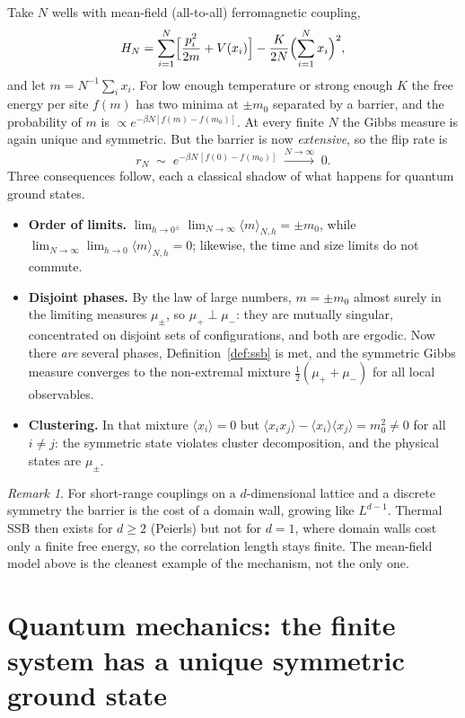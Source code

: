 \documentclass[11pt,a4paper]{article}
\theoremstyle{definition}
\theoremstyle{remark}
\newtheorem*{remark}{Remark}
\newcommand{\ev}[1]{\langle #1\rangle}
\begin{document}
Take $N$ wells with mean-field (all-to-all) ferromagnetic coupling,
\begin{equation}
H_N=\sum_{i=1}^N\Bigl[\frac{p_i^2}{2m}+V(x_i)\Bigr]-\frac{K}{2N}\Bigl(\sum_{i=1}^Nx_i\Bigr)^2,
\end{equation}
and let $m=N^{-1}\sum_ix_i$. For low enough temperature or strong enough $K$ the free energy per site
$f(m)$ has two minima at $\pm m_0$ separated by a barrier, and the probability of $m$ is $\propto e^{-\beta N[f(m)-f(m_0)]}$.
At every finite $N$ the Gibbs measure is again unique and symmetric. But the barrier is now \emph{extensive}, so the
flip rate is
\begin{equation}
r_N\;\sim\;e^{-\beta N\,[f(0)-f(m_0)]}\;\xrightarrow{N\to\infty}\;0 .
\end{equation}
Three consequences follow, each a classical shadow of what happens for quantum ground states.

\begin{itemize}
\item \textbf{Order of limits.} $\lim_{h\to0^\pm}\lim_{N\to\infty}\ev{m}_{N,h}=\pm m_0$, while
$\lim_{N\to\infty}\lim_{h\to0}\ev{m}_{N,h}=0$; likewise, the time and size limits do not commute.
\item \textbf{Disjoint phases.} By the law of large numbers, $m=\pm m_0$ almost surely in the limiting
measures $\mu_\pm$, so $\mu_+\perp\mu_-$: they are mutually singular, concentrated on disjoint sets of
configurations, and both are ergodic. Now there \emph{are} several phases, Definition~\ref{def:ssb} is met, and the
symmetric Gibbs measure converges to the non-extremal mixture $\tfrac12(\mu_++\mu_-)$ for all local observables.
\item \textbf{Clustering.} In that mixture $\ev{x_i}=0$ but $\ev{x_ix_j}-\ev{x_i}\ev{x_j}=m_0^2\ne0$ for all $i\neq j$:
the symmetric state violates cluster decomposition, and the physical states are $\mu_\pm$.
\end{itemize}

\begin{remark}
For short-range couplings on a $d$-dimensional lattice and a discrete symmetry the barrier is the cost of a
domain wall, growing like $L^{d-1}$. Thermal SSB then exists for $d\ge2$ (Peierls) but not for $d=1$, where
domain walls cost only a finite free energy, so the correlation length stays finite. The mean-field
model above is the cleanest example of the mechanism, not the only one.
\end{remark}

\section{Quantum mechanics: the finite system has a unique symmetric ground state}\label{sec:quantum}
\end{document}
